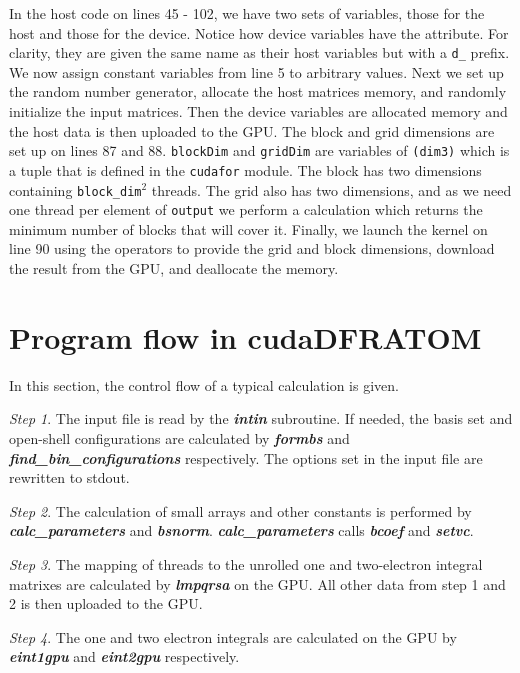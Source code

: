 In the host code on lines 45 - 102, we have two sets of variables, those for the host and those for the device. Notice how device variables have the \texttt{{\color{mygreen}{device}}} attribute. For clarity, they are given the same name as their host variables but with a \texttt{d\_} prefix. We now assign constant variables from line 5 to arbitrary values. Next we set up the random number generator, allocate the host matrices memory, and randomly initialize the input matrices. Then the device variables are allocated memory and the host data is then uploaded to the GPU. The block and grid dimensions are set up on lines 87 and 88. \texttt{blockDim} and \texttt{gridDim} are variables of \texttt{{\color{mygreen}{type}}(dim3)} which is a tuple that is defined in the \texttt{cudafor} module. The block has two dimensions containing \texttt{block\_dim}$^{2}$ threads. The grid also has two dimensions, and as we need one thread per element of \texttt{output} we perform a calculation which returns the minimum number of blocks that will cover it. Finally, we launch the kernel on line 90 using the \texttt{\color{myyellow}{<<< >>>}} operators to provide the grid and block dimensions, download the result from the GPU, and deallocate the memory.

\section{Program flow in cudaDFRATOM}
In this section, the control flow of a typical calculation is given.

\textit{Step 1}. The input file is read by the \textit{\textbf{intin}} subroutine. If needed, the basis set and open-shell configurations are calculated by \textit{\textbf{formbs}} and \textit{\textbf{find\_bin\_configurations}} respectively. The options set in the input file are rewritten to stdout.

\textit{Step 2}. The calculation of small arrays and other constants is performed by \textit{\textbf{calc\_parameters}} and \textit{\textbf{bsnorm}}. \textit{\textbf{calc\_parameters}} calls \textit{\textbf{bcoef}} and \textit{\textbf{setvc}}.

\textit{Step 3}. The mapping of threads to the unrolled one and two-electron integral matrixes are calculated by \textit{\textbf{lmpqrsa}} on the GPU. All other data from step 1 and 2 is then uploaded to the GPU.

\textit{Step 4}. The one and two electron integrals are calculated on the GPU by \textit{\textbf{eint1gpu}} and \textit{\textbf{eint2gpu}} respectively.

